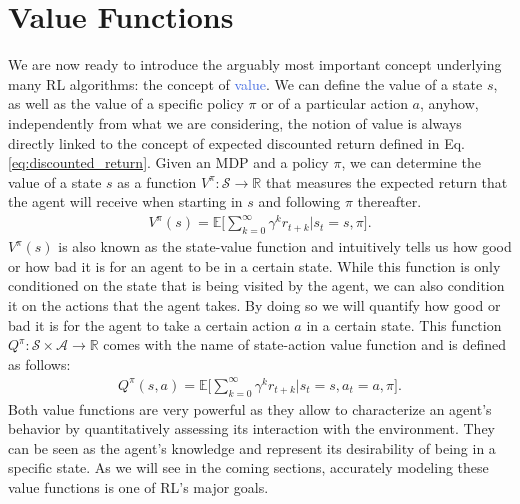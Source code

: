 \section{Value Functions}
\label{sec:value_functions}
We are now ready to introduce the arguably most important concept underlying many RL algorithms: the concept of \textcolor{RoyalBlue}{value}. We can define the value of a state $s$, as well as the value of a specific policy $\pi$ or of a particular action $a$, anyhow, independently from what we are considering, the notion of value is always directly linked to the concept of expected discounted return defined in Eq. \ref{eq:discounted_return}. Given an MDP and a policy $\pi$, we can determine the value of a state $s$ as a function $V^\pi:\mathcal{S}\rightarrow\mathbb{R}$ that measures the expected return that the agent will receive when starting in $s$ and following $\pi$ thereafter. 
\begin{align}
    V^{\pi}(s)=\mathds{E}\bigg[\sum_{k=0}^{\infty}\gamma^{k}r_{t+k}\bigg| s_t = s, \pi \bigg].
    \label{eq:state_value_function}
\end{align}
$V^{\pi}(s)$ is also known as the state-value function and intuitively tells us how good or how bad it is for an agent to be in a certain state. While this function is only conditioned on the state that is being visited by the agent, we can also condition it on the actions that the agent takes. By doing so we will quantify how good or bad it is for the agent to take a certain action $a$ in a certain state. This function $Q^\pi:\mathcal{S}\times \mathcal{A} \rightarrow\mathbb{R}$ comes with the name of state-action value function and is defined as follows:
\begin{align}
     	Q^{\pi}(s,a)=\mathds{E}\bigg[\sum_{k=0}^{\infty}\gamma^{k}r_{t+k} \bigg| s_t = s, a_t=a, \pi\bigg].
\end{align}
Both value functions are very powerful as they allow to characterize an agent's behavior by quantitatively assessing its interaction with the environment. They can be seen as the agent's knowledge and represent its desirability of being in a specific state. As we will see in the coming sections, accurately modeling these value functions is one of RL's major goals.  

